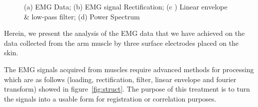 \documentclass[conference]{IEEEtran}
\begin{document}
\begin{figure}[t]
\caption{ (a) EMG Data; (b) EMG signal Rectification; (c ) Linear envelope \& low-pass filter; (d) Power Spectrum}
\label{fig:trois_figures}
\end{figure}

Herein, we present the analysis of the EMG data that we have achieved on the data collected from the arm muscle by three surface electrodes placed on the skin.\par
The EMG signals acquired from muscles require advanced methods for processing which are as follows (loading, rectification, filter, linear envelope and fourier transform) showed in figure~\ref{fig:struct}. The purpose of this treatment is to turn the signals into a usable form  for registration or correlation purposes.\par
\end{document}
